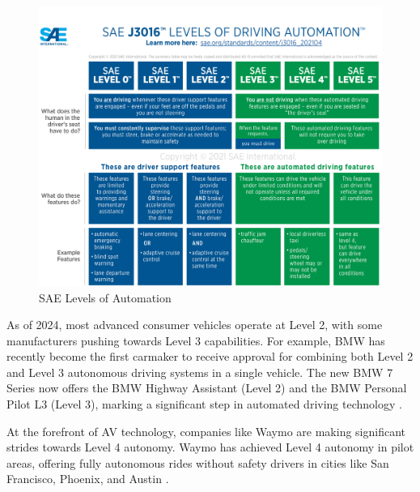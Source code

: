 \begin{figure}[h]
    \includegraphics[width=\textwidth]{figures/SAE.png}
    \centering
    \caption{SAE Levels of Automation \cite{sae2021}}
    \label{fig:SAE}
\end{figure}

As of 2024, most advanced consumer vehicles operate at Level 2, with some manufacturers pushing towards Level 3 capabilities.
For example, BMW has recently become the first carmaker to receive approval for combining both Level 2 and Level 3 autonomous driving systems in a single vehicle.
The new BMW 7 Series now offers the BMW Highway Assistant (Level 2) and the BMW Personal Pilot L3 (Level 3), marking a significant step in automated driving technology \cite{bmw2024}.

At the forefront of \ac{AV} technology, companies like Waymo
are making significant strides towards Level 4 autonomy. Waymo has achieved
Level 4 autonomy in pilot areas, offering fully autonomous rides without safety
drivers in cities like San Francisco, Phoenix, and Austin \cite{evmagazine2024}.

